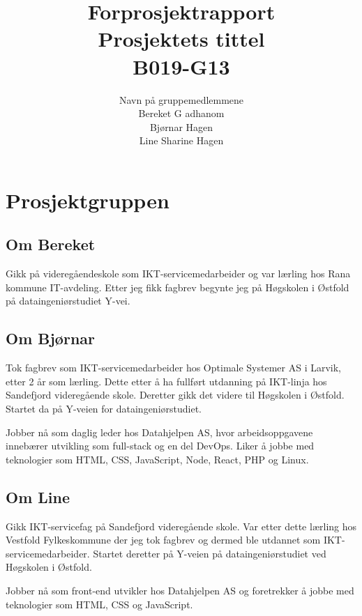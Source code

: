 \documentclass[11pt,a4paper]{report}
\begin{document}
\title{
Forprosjektrapport \\
\vspace{2cm}
Prosjektets tittel \\
B019-G13
}
\author{
\LARGE 
Navn på gruppemedlemmene \\
Bereket G adhanom \\
Bjørnar Hagen \\
Line Sharine Hagen
}
\maketitle

\section*{Prosjektgruppen}

\subsection*{Om Bereket}
Gikk på videregåendeskole som IKT-servicemedarbeider og var lærling hos Rana kommune IT-avdeling. Etter jeg fikk fagbrev begynte jeg på Høgskolen i Østfold på dataingeniørstudiet Y-vei.

\subsection*{Om Bjørnar}
Tok fagbrev som IKT-servicemedarbeider hos Optimale Systemer AS i Larvik, etter 2 år som lærling. Dette etter å ha fullført utdanning på IKT-linja hos Sandefjord videregående skole. Deretter gikk det videre til Høgskolen i Østfold. Startet da på Y-veien for dataingeniørstudiet.

Jobber nå som daglig leder hos Datahjelpen AS, hvor arbeidsoppgavene innebærer utvikling som full-stack og en del DevOps. Liker å jobbe med teknologier som HTML, CSS, JavaScript, Node, React, PHP og Linux.

\subsection*{Om Line}
Gikk IKT-servicefag på Sandefjord videregående skole. Var etter dette lærling hos Vestfold Fylkeskommune der jeg tok fagbrev og dermed ble utdannet som IKT-servicemedarbeider. Startet deretter på Y-veien på dataingeniørstudiet ved Høgskolen i Østfold. 

Jobber nå som front-end utvikler hos Datahjelpen AS og foretrekker å jobbe med teknologier som HTML, CSS og JavaScript.
\end{document}
